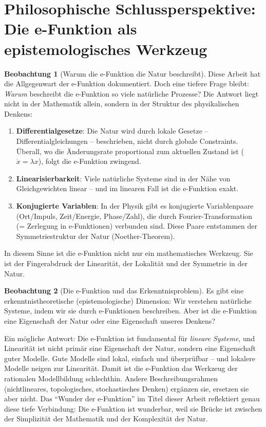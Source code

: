 ﻿\documentclass[a4paper,12pt]{report}
\theoremstyle{definition}
\newtheorem{beobachtung}{Beobachtung}
\begin{document}
	\section{Philosophische Schlussperspektive: Die e-Funktion als epistemologisches Werkzeug}
	
	\begin{beobachtung}[Warum die e-Funktion die Natur beschreibt]
		Diese Arbeit hat die Allgegenwart der e-Funktion dokumentiert. Doch eine tiefere Frage bleibt: \emph{Warum} beschreibt die e-Funktion so viele natürliche Prozesse? Die Antwort liegt nicht in der Mathematik allein, sondern in der Struktur des physikalischen Denkens:
		\begin{enumerate}
			\item[-] \textbf{Differentialgesetze}: Die Natur wird durch lokale Gesetze -- Differentialgleichungen -- beschrieben, nicht durch globale Constraints. Überall, wo die Änderungsrate proportional zum aktuellen Zustand ist ($\dot{x} = \lambda x$), folgt die e-Funktion zwingend.
			\item[-] \textbf{Linearisierbarkeit}: Viele natürliche Systeme sind in der Nähe von Gleichgewichten linear -- und im linearen Fall ist die e-Funktion exakt.
			\item[-] \textbf{Konjugierte Variablen}: In der Physik gibt es konjugierte Variablenpaare (Ort/Im\-puls, Zeit/Energie, Phase/Zahl), die durch Fourier-Transformation (= Zerlegung in e-Funktionen) verbunden sind. Diese Paare entstammen der Symmetriestruktur der Natur (Noether-Theorem).
		\end{enumerate}
		In diesem Sinne ist die e-Funktion nicht nur ein mathematisches Werkzeug. Sie ist der Fingerabdruck der Linearität, der Lokalität und der Symmetrie in der Natur.
	\end{beobachtung}
	
	\begin{beobachtung}[Die e-Funktion und das Erkenntnisproblem]
		Es gibt eine erkenntnistheoretische (epistemologische) Dimension: Wir verstehen natürliche Systeme, indem wir sie durch e-Funktionen beschreiben. Aber ist die e-Funktion eine Eigenschaft der Natur oder eine Eigenschaft unseres Denkens?
		
		Ein mögliche Antwort: Die e-Funktion ist fundamental für \emph{lineare Systeme}, und Linearität ist nicht primär eine Eigenschaft der Natur, sondern eine Eigenschaft guter Modelle. Gute Modelle sind lokal, einfach und überprüfbar -- und lokalere Modelle neigen zur Linearität. Damit ist die e-Funktion das Werkzeug der rationalen Modellbildung schlechthin. Andere Beschreibungsrahmen (nichtlineares, topologisches, stochastisches Denken) ergänzen sie, ersetzen sie aber nicht. Das ``Wunder der e-Funktion'' im Titel dieser Arbeit reflektiert genau diese tiefe Verbindung: Die e-Funktion ist wunderbar, weil sie Brücke ist zwischen der Simplizität der Mathematik und der Komplexität der Natur.
	\end{beobachtung}
	
\end{document}
